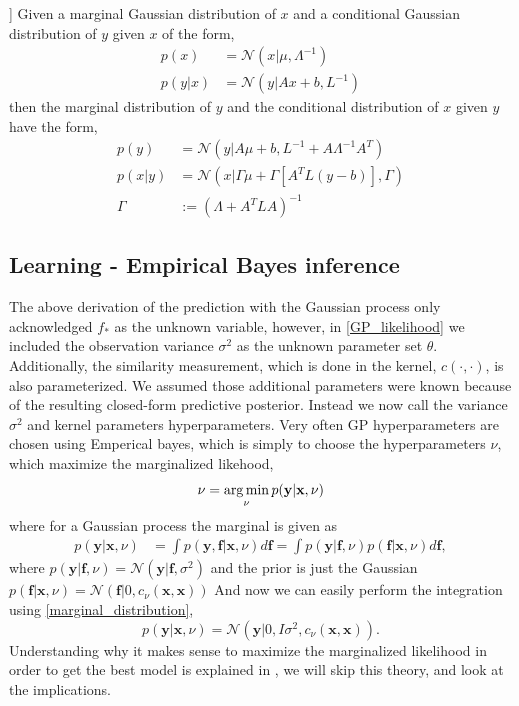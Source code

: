 \begin{testexample2}[Trick with normal distributions [from Bishops book?]]
    Given a marginal Gaussian distribution of $x$ and a conditional Gaussian distribution
    of $y$ given $x$ of the form, 
    \begin{align*}
        p(x) &= \mathcal{N}(x|\mu, \Lambda^{-1})\\
        p(y|x) &= \mathcal{N}(y|Ax+b, L^{-1})
    \end{align*}
    then the marginal distribution of $y$ and the conditional distribution of $x$ given $y$
    have the form, 
    \begin{align}
        p(y) &= \mathcal{N}(y|A\mu+b,L^{-1}+A \Lambda^{-1}A^T) \label{marginal_distribution}\\
        p(x|y) &= \mathcal{N}(x|\Gamma \mu+\Gamma [A^TL(y-b)],\Gamma ) \label{posterior_distribution}\\
        \Gamma &:= (\Lambda +A^TLA)^{-1} \label{Gamma}
    \end{align}
\end{testexample2}




\subsection{Learning - Empirical Bayes inference}

The above derivation of the prediction with the Gaussian process only acknowledged $f_*$ as the unknown
variable, however, in \eqref{GP_likelihood} we included the observation variance $\sigma^2$
as the unknown parameter set $\theta$. Additionally, the similarity measurement, which is done in the kernel, 
 $c(\cdot , \cdot )$, is also parameterized. We assumed those additional parameters were known because
of the resulting closed-form predictive posterior. Instead we now call the variance $\sigma^2$ and
kernel parameters hyperparameters. Very often GP hyperparameters are chosen using Emperical bayes, which is simply
to choose the hyperparameters $\nu$, which maximize the marginalized likehood,  
\begin{equation}\label{GP_optim}
    \nu = \operatorname*{arg\,min}_{\nu} p(\textbf{y}|\textbf{x}, \nu)
\end{equation}
where for a Gaussian process the marginal is given as 
\begin{align*}
    p(\textbf{y}|\textbf{x}, \nu) &= \int  p(\textbf{y}, \textbf{f}|\textbf{x}, \nu) d\textbf{f} = \int p(\textbf{y}|\textbf{f},\nu)p(\textbf{f}|\textbf{x},\nu) d\textbf{f},
\end{align*}
where  $p(\textbf{y}|\textbf{f},\nu) = \mathcal{N}(\textbf{y}|\textbf{f},\sigma^2)$ and the prior is
just the Gaussian $p(\textbf{f}|\textbf{x},\nu) = \mathcal{N}(\textbf{f}|0, c_{\nu}(\textbf{x}, \textbf{x}))$
And now we can easily perform the integration using \eqref{marginal_distribution}, 
$$p(\textbf{y}|\textbf{x}, \nu) = \mathcal{N}(\textbf{y}|0,I\sigma^2, c_{\nu}(\textbf{x}, \textbf{x})).$$
Understanding why it makes sense to maximize the marginalized likelihood in order to get the best model
is explained in \cite[165]{bishop}, we will skip this theory, and look at the implications. 

